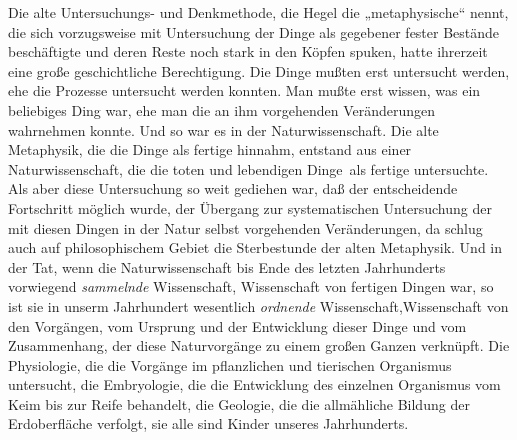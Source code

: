 Die alte Untersuchungs- und Denkmethode, die Hegel die
„metaphysische`` nennt, die sich vorzugsweise mit Untersuchung der Dinge
als gegebener fester Bestände beschäftigte und deren Reste noch stark in
den Köpfen spuken, hatte ihrerzeit eine große geschichtliche
Berechtigung. Die Dinge mußten erst untersucht werden, ehe die Prozesse
untersucht werden konnten. Man mußte erst wissen, was ein beliebiges
Ding war, ehe man die an ihm vorgehenden Veränderungen wahrnehmen
konnte. Und so war es in der Naturwissenschaft. Die alte Metaphysik, die
die Dinge als fertige hinnahm, entstand aus einer Naturwissenschaft, die
die toten und lebendigen Dinge\est\ als fertige untersuchte. Als aber diese
Untersuchung so weit gediehen war, daß der entscheidende Fortschritt
möglich wurde, der Übergang zur systematischen Untersuchung der mit
diesen Dingen in der Natur selbst vorgehenden Veränderungen, da schlug
auch auf philosophischem Gebiet die Sterbestunde der alten Metaphysik.
Und in der Tat, wenn die Naturwissenschaft bis Ende des letzten
Jahrhunderts vorwiegend \emph{sammelnde }Wissenschaft, Wissenschaft von
fertigen Dingen war, so ist sie in unserm Jahrhundert
wesentlich \emph{ordnende} Wissenschaft,Wissenschaft von den Vorgängen,
vom Ursprung und der Entwicklung dieser Dinge und vom Zusammenhang, der
diese Naturvorgänge zu einem großen Ganzen verknüpft. Die Physiologie,
die die Vorgänge im pflanzlichen und tierischen Organismus untersucht,
die Embryologie, die die Entwicklung des einzelnen Organismus vom Keim
bis zur Reife behandelt, die Geologie, die die allmähliche Bildung der
Erdoberfläche verfolgt, sie alle sind Kinder unseres Jahrhunderts.


